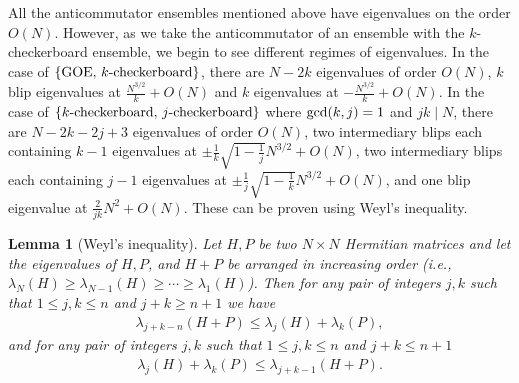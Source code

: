 \documentclass[11pt,reqno]{amsart}
\numberwithin{equation}{section}
\theoremstyle{plain}
\newtheorem{lemma}[thm]{Lemma}
\begin{document}
All the anticommutator ensembles mentioned above have eigenvalues on the order $O(N)$. However, as we take the anticommutator of an ensemble with the $k$-checkerboard ensemble, we begin to see different regimes of eigenvalues. In the case of $\{\textup{GOE, }k\textup{-checkerboard}\}$, there are $N-2k$ eigenvalues of order $O(N)$, $k$ blip eigenvalues at $\frac{N^{3/2}}{k}+O(N)$ and $k$ eigenvalues at $-\frac{N^{3/2}}{k}+O(N)$. In the case of $\{k\textup{-checkerboard, }j\textup{-checkerboard}\}$ where $\textup{gcd}(k, j)=1$ and $jk\mid N$, there are $N-2k-2j+3$ eigenvalues of order $O(N)$, two intermediary blips each containing $k-1$ eigenvalues at $\pm \frac{1}{k}\sqrt{1-\frac{1}{j}}N^{3/2}+O(N)$, two intermediary blips each containing $j-1$ eigenvalues at $\pm \frac{1}{j}\sqrt{1-\frac{1}{k}}N^{3/2}+O(N)$, and one blip eigenvalue at $\frac{2}{jk}N^2+O(N)$. These can be proven using Weyl's inequality.


\begin{lemma}[Weyl's inequality]\cite{Weyl}
    Let $H,P$ be two $N\times N$ Hermitian matrices and let the eigenvalues of $H,P$, and $H+P$ be arranged in increasing order (i.e., $\lambda_N(H)\geq \lambda_{N-1}(H)\geq \cdots\geq \lambda_1(H)$). Then for any pair of integers $j,k$ such that $1\leq j,k\leq n$ and $j+k\geq n+1$ we have
    \begin{align}
       \lambda_{j+k-n}(H+P)\leq \lambda_j(H)+\lambda_k(P),
    \end{align}
    and for any pair of integers $j,k$ such that $1\leq j,k\leq n$ and $j+k\leq n+1$
    \begin{align}
    \lambda_j(H)+\lambda_k(P)\leq \lambda_{j+k-1}(H+P).
    \end{align}
\end{lemma}
\end{document}
